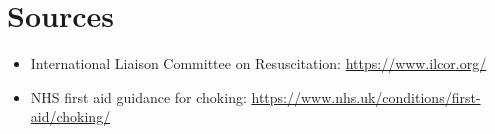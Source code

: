 \section*{Sources}
\begin{itemize}
    \item International Liaison Committee on Resuscitation: \url{https://www.ilcor.org/}
    \item NHS first aid guidance for choking: \url{https://www.nhs.uk/conditions/first-aid/choking/}
\end{itemize}
